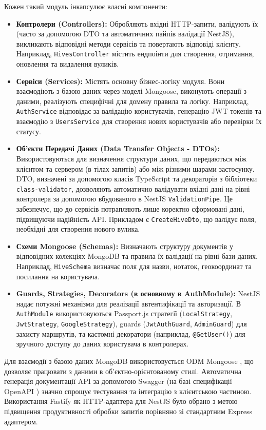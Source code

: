 Кожен такий модуль інкапсулює власні компоненти:
\begin{itemize}
    \item \textbf{Контролери (Controllers):} Обробляють вхідні HTTP-запити, валідують їх (часто за допомогою DTO та автоматичних пайпів валідації NestJS), викликають відповідні методи сервісів та повертають відповіді клієнту. Наприклад, \texttt{HivesController} містить ендпоінти для створення, отримання, оновлення та видалення вуликів.
    \item \textbf{Сервіси (Services):} Містять основну бізнес-логіку модуля. Вони взаємодіють з базою даних через моделі Mongoose, виконують операції з даними, реалізують специфічні для домену правила та логіку. Наприклад, \texttt{AuthService} відповідає за валідацію користувачів, генерацію JWT токенів та взаємодію з \texttt{UsersService} для створення нових користувачів або перевірки їх статусу.
    \item \textbf{Об'єкти Передачі Даних (Data Transfer Objects - DTOs):} Використовуються для визначення структури даних, що передаються між клієнтом та сервером (в тілах запитів) або між різними шарами застосунку. DTO, визначені за допомогою класів TypeScript та декораторів з бібліотеки \texttt{class-validator}, дозволяють автоматично валідувати вхідні дані на рівні контролера за допомогою вбудованого в NestJS \texttt{ValidationPipe}. Це забезпечує, що до сервісів потрапляють лише коректно сформовані дані, підвищуючи надійність API. Прикладом є \texttt{CreateHiveDto}, що валідує поля, необхідні для створення нового вулика.
    \item \textbf{Схеми Mongoose (Schemas):} Визначають структуру документів у відповідних колекціях MongoDB та правила їх валідації на рівні бази даних. Наприклад, \texttt{HiveSchema} визначає поля для назви, нотаток, геокоординат та посилання на користувача.
    \item \textbf{Guards, Strategies, Decorators (в основному в AuthModule):} NestJS надає потужні механізми для реалізації автентифікації та авторизації. В \texttt{AuthModule} використовуються Passport.js стратегії (\texttt{LocalStrategy}, \texttt{JwtStrategy}, \texttt{GoogleStrategy}), guards (\texttt{JwtAuthGuard}, \texttt{AdminGuard}) для захисту маршрутів, та кастомні декоратори (наприклад, \texttt{@GetUser()}) для зручного доступу до даних користувача в контролерах.
\end{itemize}
Для взаємодії з базою даних MongoDB \cite{mongodb} використовується ODM Mongoose \cite{mongoose}, що дозволяє працювати з даними в об'єктно-орієнтованому стилі. Автоматична генерація документації API за допомогою Swagger (на базі специфікації OpenAPI \cite{openapi}) значно спрощує тестування та інтеграцію з клієнтською частиною. Використання Fastify \cite{fastify} як HTTP-адаптера для NestJS було обрано з метою підвищення продуктивності обробки запитів порівняно зі стандартним Express адаптером.


